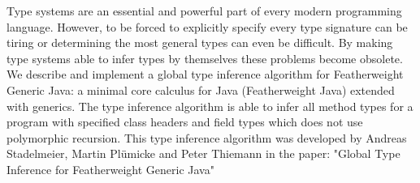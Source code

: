 Type systems are an essential and powerful part of every modern programming language.
However, to be forced to explicitly specify every type signature can be tiring or
determining the most general types can even be difficult.
By making type systems able to infer types by themselves these problems become obsolete.
We describe and implement a global type inference algorithm for Featherweight Generic Java: a minimal core calculus for Java (Featherweight Java) extended with generics.
The type inference algorithm is able to infer all method types for a program with specified class headers and field types which does not use polymorphic recursion.
This type inference algorithm was developed by Andreas Stadelmeier, Martin Plümicke and Peter Thiemann in the paper: "Global Type Inference for Featherweight Generic Java"
